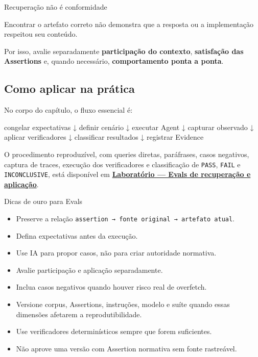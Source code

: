 \documentclass[
  10pt,
  a4paper,
  oneside]{book}
\newenvironment{Shaded}{}{}
\newcommand{\NormalTok}[1]{#1}
\providecommand{\tightlist}{%
  \setlength{\itemsep}{0pt}\setlength{\parskip}{0pt}}
\renewenvironment{Shaded}{\begin{snugshade}}{\end{snugshade}}%
\begin{document}
\begin{warningbox}{Recuperação não é conformidade}

Encontrar o artefato correto não demonstra que a resposta ou a
implementação respeitou seu conteúdo.

Por isso, avalie separadamente \textbf{participação do contexto},
\textbf{satisfação das Assertions} e, quando necessário,
\textbf{comportamento ponta a ponta}.

\end{warningbox}

\hypertarget{como-aplicar-na-pruxe1tica}{%
\subsection{Como aplicar na prática}\label{como-aplicar-na-pruxe1tica}}

No corpo do capítulo, o fluxo essencial é:

\begin{Shaded}
\begin{Highlighting}[]
\NormalTok{congelar expectativas}
\NormalTok{        ↓}
\NormalTok{definir cenário}
\NormalTok{        ↓}
\NormalTok{executar Agent}
\NormalTok{        ↓}
\NormalTok{capturar observado}
\NormalTok{        ↓}
\NormalTok{aplicar verificadores}
\NormalTok{        ↓}
\NormalTok{classificar resultados}
\NormalTok{        ↓}
\NormalTok{registrar Evidence}
\end{Highlighting}
\end{Shaded}

O procedimento reproduzível, com queries diretas, paráfrases, casos
negativos, captura de traces, execução dos verificadores e classificação
de \texttt{PASS}, \texttt{FAIL} e \texttt{INCONCLUSIVE}, está disponível
em
\textbf{\protect\hyperlink{laboratorio-evals-recuperacao-aplicacao}{Laboratório
--- Evals de recuperação e aplicação}}.

\begin{tipbox}{Dicas de ouro para Evals}

\begin{itemize}
\tightlist
\item
  Preserve a relação
  \texttt{assertion\ →\ fonte\ original\ →\ artefato\ atual}.
\item
  Defina expectativas antes da execução.
\item
  Use IA para propor casos, não para criar autoridade normativa.
\item
  Avalie participação e aplicação separadamente.
\item
  Inclua casos negativos quando houver risco real de overfetch.
\item
  Versione corpus, Assertions, instruções, modelo e suíte quando essas
  dimensões afetarem a reprodutibilidade.
\item
  Use verificadores determinísticos sempre que forem suficientes.
\item
  Não aprove uma versão com Assertion normativa sem fonte rastreável.
\end{itemize}

\end{tipbox}
\end{document}
